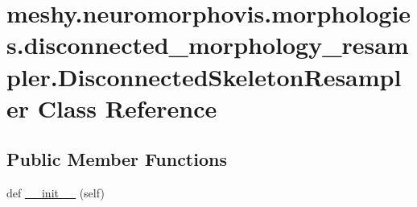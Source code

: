 \hypertarget{classmeshy_1_1neuromorphovis_1_1morphologies_1_1disconnected__morphology__resampler_1_1DisconnectedSkeletonResampler}{}\section{meshy.\+neuromorphovis.\+morphologies.\+disconnected\+\_\+morphology\+\_\+resampler.\+Disconnected\+Skeleton\+Resampler Class Reference}
\label{classmeshy_1_1neuromorphovis_1_1morphologies_1_1disconnected__morphology__resampler_1_1DisconnectedSkeletonResampler}


 


\subsection*{Public Member Functions}
\begin{DoxyCompactItemize}
\item 
def \hyperlink{classmeshy_1_1neuromorphovis_1_1morphologies_1_1disconnected__morphology__resampler_1_1DisconnectedSkeletonResampler_adc7b672ed724ed1b4b7ccde87bdc1ccc}{\+\_\+\+\_\+init\+\_\+\+\_\+} (self)
\end{DoxyCompactItemize}
